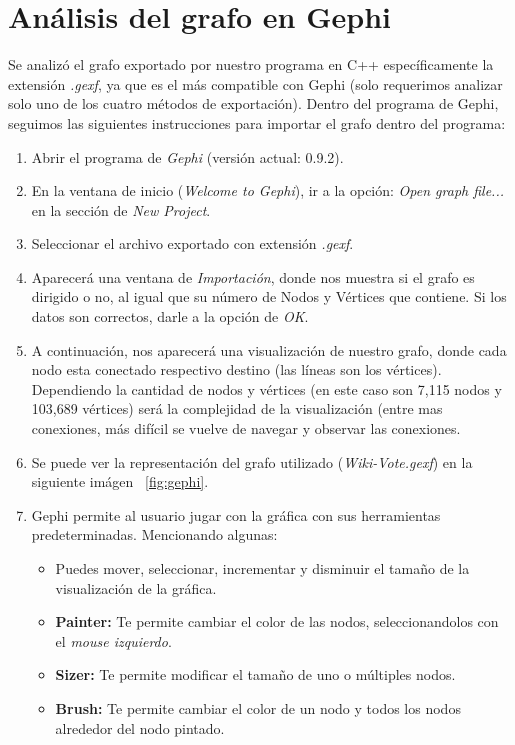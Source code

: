 \documentclass[acmlarge,screen]{acmart}
\begin{document}
\section{Análisis del grafo en Gephi}
Se analizó el grafo exportado por nuestro programa en C++ específicamente la extensión {\it .gexf}, ya que es el más compatible con Gephi (solo requerimos analizar solo uno de los cuatro métodos de exportación). Dentro del programa de Gephi, seguimos las siguientes instrucciones para importar el grafo dentro del programa:

\begin{enumerate}
 \item Abrir el programa de {\it Gephi} (versión actual: 0.9.2).
 \item En la ventana de inicio ({\it Welcome to Gephi}), ir a la opción: {\it Open graph file...} en la sección de {\it New Project}.
 \item Seleccionar el archivo exportado con extensión {\it .gexf}.
 \item Aparecerá una ventana de {\it Importación}, donde nos muestra si el grafo es dirigido o no, al igual que su número de Nodos y Vértices que contiene. Si los datos son correctos, darle a la opción de {\it OK}.
 \item A continuación, nos aparecerá una visualización de nuestro grafo, donde cada nodo esta conectado respectivo destino (las líneas son los vértices). Dependiendo la cantidad de nodos y vértices (en este caso son 7,115 nodos y 103,689 vértices) será la complejidad de la visualización (entre mas conexiones, más difícil se vuelve de navegar y observar las conexiones.
 \item Se puede ver la representación del grafo utilizado ({\it Wiki-Vote.gexf}) en la siguiente imágen ~\ref{fig:gephi}.
 \item Gephi permite al usuario jugar con la gráfica con sus herramientas predeterminadas. Mencionando algunas:
 \begin{itemize}
  \item Puedes mover, seleccionar, incrementar y disminuir el tamaño de la visualización de la gráfica.
  \item {\bf Painter:} Te permite cambiar el color de las nodos, seleccionandolos con el {\it mouse izquierdo}.
  \item {\bf Sizer:} Te permite modificar el tamaño de uno o múltiples nodos.
  \item {\bf Brush:} Te permite cambiar el color de un nodo y todos los nodos alrededor del nodo pintado.

\end{itemize}
\end{enumerate}
\end{document}
